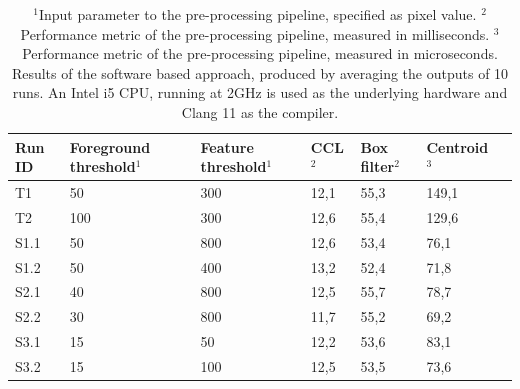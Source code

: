 \documentclass[12pt]{report}
\begin{document}
\begin{table}[!h]
    \centering
    \begin{tabular}{|p{0.8cm}|p{2.5cm}|p{2cm}||p{1.25cm}|p{1.25cm}|p{1.9cm}|p{1cm}|}
        \hline
        \textbf{Run ID}&\textbf{Foreground threshold$^{1}$}&\textbf{Feature threshold$^{1}$}&\textbf{CCL$^{2}$}&\textbf{Box filter$^{2}$}&\textbf{Centroid$^{3}$}\\
        \hline
        T1&50&300&12,1&55,3&149,1\\
        \hline
        T2&100&300&12,6&55,4&129,6\\
        \hline
        S1.1&50&800&12,6&53,4&76,1\\
        \hline
        S1.2&50&400&13,2&52,4&71,8\\
        \hline
        S2.1&40&800&12,5&55,7&78,7\\
        \hline
        S2.2&30&800&11,7&55,2&69,2\\
        \hline
        S3.1&15&50&12,2&53,6&83,1\\
        \hline
        S3.2&15&100&12,5&53,5&73,6\\
        \hline
    \end{tabular}
    \caption{$^{1}$Input parameter to the pre-processing pipeline, specified as pixel value. $^{2}$Performance metric of the pre-processing pipeline, measured in milliseconds. $^{3}$Performance metric of the pre-processing pipeline, measured in microseconds. \newline Results of the software based approach, produced by averaging the outputs of 10 runs. An Intel i5 CPU, running at 2GHz is used as the underlying hardware and Clang 11 as the compiler.}
    \label{table:res_sw}
\end{table}
\end{document}
